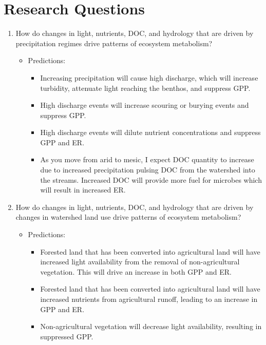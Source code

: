 \section{Research Questions}
\begin{enumerate}
    \item How do changes in light, nutrients, DOC, and hydrology that are driven by precipitation regimes drive patterns of ecosystem metabolism?
    \begin{itemize}
        \item Predictions:
         \begin{itemize}
        \item Increasing precipitation will cause high discharge, which will increase turbidity, attenuate light reaching the benthos, and suppress GPP.
        \item High discharge events will increase scouring or burying events and suppress GPP.
        \item High discharge events will dilute nutrient concentrations and suppress GPP and ER.
        \item As you move from arid to mesic, I expect DOC quantity to increase due to increased precipitation pulsing DOC from the watershed into the streams. Increased DOC will provide more fuel for microbes which will result in increased ER.
    \end{itemize}
    \end{itemize}

    \item How do changes in light, nutrients, DOC, and hydrology that are driven by changes in watershed land use drive patterns of ecosystem metabolism?
    \begin{itemize}
        \item Predictions:
        \begin{itemize}
        \item  Forested land that has been converted into agricultural land will have increased light availability from the removal of non-agricultural vegetation. This will drive an increase in both GPP and ER.
        \item  Forested land that has been converted into agricultural land will have increased nutrients from agricultural runoff, leading to an increase in GPP and ER.
        \item Non-agricultural vegetation will decrease light availability, resulting in suppressed GPP.
    \end{itemize}
    \end{itemize}
    
\end{enumerate}

         
         
         
         



  


\endinput

